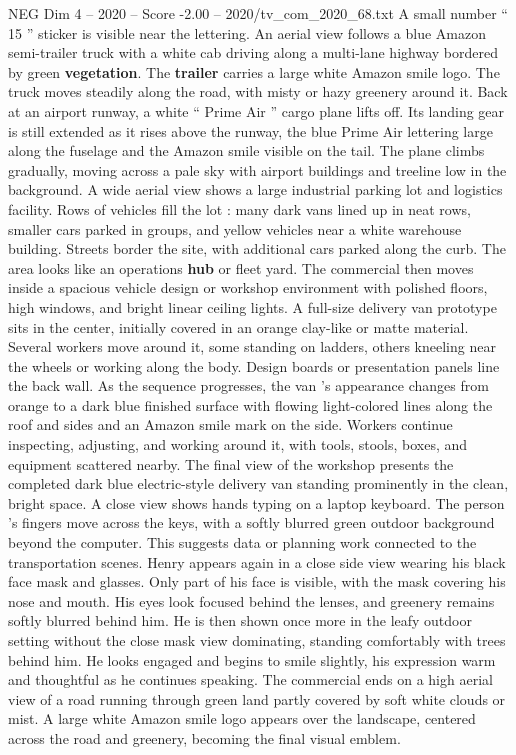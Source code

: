 \begin{textsample}{NEG Dim 4 – 2020 – Score -2.00 – 2020/tv\_com\_2020\_68.txt}
A small number “ 15 ” sticker is visible near the lettering.
An aerial view follows a blue Amazon semi-trailer truck with a white cab driving along a multi-lane highway bordered by green \textbf{vegetation}.
The \textbf{trailer} carries a large white Amazon smile logo.
The truck moves steadily along the road, with misty or hazy greenery around it.
Back at an airport runway, a white “ Prime Air ” cargo plane lifts off.
Its landing gear is still extended as it rises above the runway, the blue Prime Air lettering large along the fuselage and the Amazon smile visible on the tail.
The plane climbs gradually, moving across a pale sky with airport buildings and treeline low in the background.
A wide aerial view shows a large industrial parking lot and logistics facility.
Rows of vehicles fill the lot : many dark vans lined up in neat rows, smaller cars parked in groups, and yellow vehicles near a white warehouse building.
Streets border the site, with additional cars parked along the curb.
The area looks like an operations \textbf{hub} or fleet yard.
The commercial then moves inside a spacious vehicle design or workshop environment with polished floors, high windows, and bright linear ceiling lights.
A full-size delivery van prototype sits in the center, initially covered in an orange clay-like or matte material.
Several workers move around it, some standing on ladders, others kneeling near the wheels or working along the body.
Design boards or presentation panels line the back wall.
As the sequence progresses, the van ’s appearance changes from orange to a dark blue finished surface with flowing light-colored lines along the roof and sides and an Amazon smile mark on the side.
Workers continue inspecting, adjusting, and working around it, with tools, stools, boxes, and equipment scattered nearby.
The final view of the workshop presents the completed dark blue electric-style delivery van standing prominently in the clean, bright space.
A close view shows hands typing on a laptop keyboard.
The person ’s fingers move across the keys, with a softly blurred green outdoor background beyond the computer.
This suggests data or planning work connected to the transportation scenes.
Henry appears again in a close side view wearing his black face mask and glasses.
Only part of his face is visible, with the mask covering his nose and mouth.
His eyes look focused behind the lenses, and greenery remains softly blurred behind him.
He is then shown once more in the leafy outdoor setting without the close mask view dominating, standing comfortably with trees behind him.
He looks engaged and begins to smile slightly, his expression warm and thoughtful as he continues speaking.
The commercial ends on a high aerial view of a road running through green land partly covered by soft white clouds or mist.
A large white Amazon smile logo appears over the landscape, centered across the road and greenery, becoming the final visual emblem.

\end{textsample}
